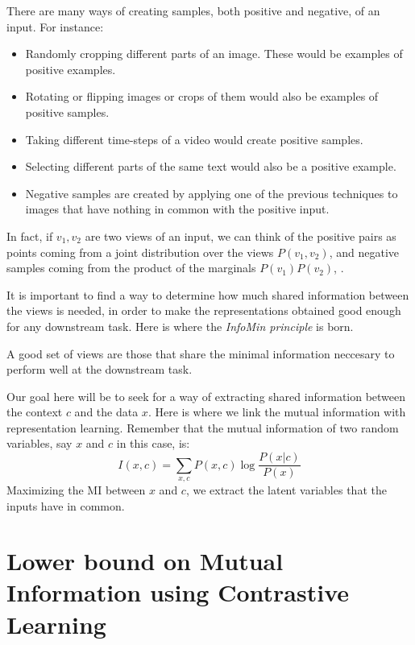 There are many ways of creating samples, both positive and negative, of an input. For instance:
\begin{itemize}
    \item Randomly cropping different parts of an image. These would be examples of positive examples.
    \item Rotating or flipping images or crops of them would also be examples of positive samples.
    
    \item Taking different time-steps of a video would create positive samples.
    \item Selecting different parts of the same text would also be a positive example.    
    \item Negative samples are created by applying one of the previous techniques to images that have nothing in common with the positive input.
\end{itemize}

In fact, if $v_1,v_2$ are two views of an input, we can think of the positive pairs as points coming from a joint distribution over the views $P(v_1,v_2)$, and negative samples coming from the product of the marginals $P(v_1)P(v_2)$, \citep{tian_what_2020}.

It is important to find a way to determine how much shared information between the views is needed, in order to make the representations obtained good enough for any downstream task. Here is where the \emph{InfoMin principle} is born. 

\begin{ndef}
    A good set of views are those that share the minimal information neccesary to perform well at the downstream task.
\end{ndef} 


Our goal here will be to seek for a way of extracting shared information between the context $c$ and the data $x$. Here is where we link the mutual information with representation learning. Remember that the mutual information of two random variables, say $x$ and $c$ in this case, is:
\begin{equation}\label{EQ:MI}
I(x,c) = \sum_{x,c}P(x,c)\log\frac{P(x|c)}{P(x)}
\end{equation}
Maximizing the MI between $x$ and $c$, we extract the latent variables that the inputs have in common. 

\section{Lower bound on Mutual Information using Contrastive Learning}

